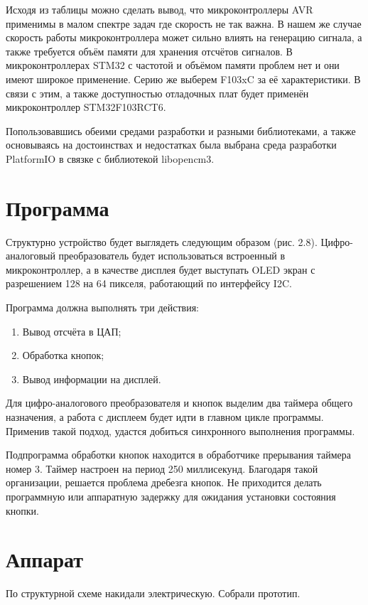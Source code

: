 \documentclass[a4paper, 14pt]{extarticle}
\begin{document}
	Исходя из таблицы можно сделать вывод, что микроконтроллеры AVR применимы в малом спектре задач где скорость не так важна. В нашем же случае скорость работы микроконтроллера может сильно влиять на генерацию сигнала, а также требуется объём памяти для хранения отсчётов сигналов. В микроконтроллерах STM32 с частотой и объёмом памяти проблем нет и они имеют широкое применение. Серию же выберем F103xC за её характеристики. В связи с этим, а также доступностью отладочных плат будет применён микроконтроллер STM32F103RCT6.
	
	Попользовавшись обеими средами разработки и разными библиотеками, а также основываясь на достоинствах и недостатках была выбрана среда разработки PlatformIO в связке с библиотекой libopencm3.
	
\section*{Программа}
	Структурно устройство будет выглядеть следующим образом (рис. 2.8). Цифро-аналоговый преобразователь будет использоваться встроенный в микроконтроллер, а в качестве дисплея будет выступать OLED экран с разрешением 128 на 64 пикселя, работающий по интерфейсу I2C.

	Программа должна выполнять три действия:
	
	\begin{enumerate}
		\item Вывод отсчёта в ЦАП;
		\item Обработка кнопок;
		\item Вывод информации на дисплей.
	\end{enumerate}
	
	
	Для цифро-аналогового преобразователя и кнопок выделим два таймера общего назначения, а работа с дисплеем будет идти в главном цикле программы. Применив такой подход, удастся добиться синхронного выполнения программы. 
	
	Подпрограмма обработки кнопок находится в обработчике прерывания таймера номер 3. Таймер настроен на период 250 миллисекунд. Благодаря такой организации, решается проблема дребезга кнопок. Не приходится делать программную или аппаратную задержку для ожидания установки состояния кнопки.
	
\section*{Аппарат}
	По структурной схеме накидали электрическую. Собрали прототип.
\end{document}
